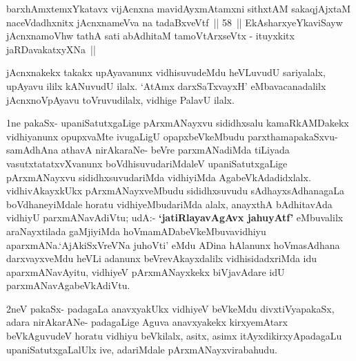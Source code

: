 \begin{shl}
barxhAmxtemxYkatavx vijAcnxna mavidAyxmAtamxni sithxtAM
sakaqjAjxtaM naceVdadhxnitx jAcnxnameVva na tadaBxveVtf~|| 58~||
EkAsharxyeYkaviSayw jAcnxnamoVhw tathA sati
abAdhitaM tamoV\s tArxseVtx - ituyxkitx jaRDavakatxyXNa~||
\end{shl}

\begin{artha}
jAcnxnakekx takakx upAyavanunx vidhisuvudeMdu heVLuvudU sariyalalx,
upAyavu ililx kANuvudU ilalx. `AtAmx darxSaTxvayxH' eMbavacanadalilx 
jAcnxnoVpAyavu toVruvudilalx, vidhige PalavU ilalx.
\end{artha}

\centerline{}

\begin{artha}
1ne pakaSx- upaniSatutxgaLige pArxmANayxvu sididhxsalu kamaRkAMDakekx
vidhiyanunx opupxvaMte ivugaLigU opapxbeVkeMbudu parxthamapakaSxvu-
samAdhAna athavA nirAkaraNe- beVre parxmANadiMda
tiLiyada vasutxtatatxvXvanunx boVdhisuvudariMdaleV upaniSatutxgaLige
pArxmANayxvu sididhxsuvudariMda vidhiyiMda
AgabeVkAdadidxlalx. vidhivAkayxkUkx pArxmANayxveMbudu sididhxsuvudu
sAdhayxsAdhanagaLa boVdhaneyiMdale horatu vidhiyeMbudariMda alalx,
anayxthA bAdhitavAda vidhiyU parxmANavAdiVtu;  udA:- \textbf{`jatiRlayavAgAvx ja{\null}huyAtf'}
eMbuvalilx araNayxtilada gaMjiyiMda  hoVmamADabeVkeMbuvavidhiyu
aparxmANa.`AjAkiSxVreVNa juhoVti' eMdu ADina hAlanunx hoVmasAdhana darxvayxveMdu
heVLi adanunx beVrevAkayxdalilx vidhisidadxriMda idu aparxmANavAyitu,
vidhiyeV pArxmANayxkekx biVjavAdare idU parxmANavAgabeVkAdiVtu.
\end{artha}

\begin{artha}
2neV pakaSx- padagaLa anavxyakUkx vidhiyeV beVkeMdu divxtiVyapakaSx, adara nirAkarANe- padagaLige Aguva anavxyakekx kirxyemAtarx beVkAguvudeV horatu vidhiyu beVkilalx, asitx, asimx itAyxdikirxyApadagaLu upaniSatutxgaLalUlx ive, adariMdale pArxmANayxvirabahudu.
\end{artha}

